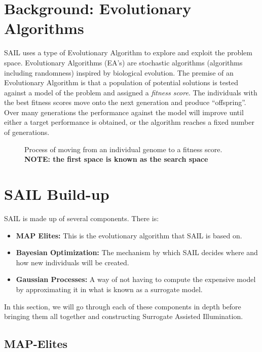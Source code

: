 \documentclass{sig-alternate}
\begin{document}
\section{Background: Evolutionary Algorithms}
\label{sec:evolutionaryAlgorithms}

SAIL uses a type of Evolutionary Algorithm to explore and exploit the problem space.
Evolutionary Algorithms (EA's) are stochastic algorithms (algorithms including randomness) inspired by biological evolution.
The premise of an Evolutionary Algorithm is that a population of potential solutions is tested against a model of the problem and assigned a \textit{fitness score}.
The individuals with the best fitness scores move onto the next generation and produce ``offspring''.
Over many generations the performance against the model will improve until either a target performance is obtained, or the algorithm reaches a fixed number of generations. 


\begin{figure*}[th]
\centering
{}
\caption{Process of moving from an individual genome to a fitness score. \textbf{NOTE: the first space is known as the search space}}
\label{fig:genome-to-fitness}
\end{figure*}

\section{SAIL Build-up}
\label{sec:SAILBuildUp}
SAIL is made up of several components. There is:
\begin{itemize}
  \item \textbf{MAP Elites:} This is the evolutionary algorithm that SAIL is based on.
  \item \textbf{Bayesian Optimization:} The mechanism by which SAIL decides where and how new individuals will be created.
  \item \textbf{Gaussian Processes:} A way of not having to compute the expensive model by approximating it in what is known as a surrogate model.
\end{itemize}
In this section, we will go through each of these components in depth before bringing them all together and constructing Surrogate Assisted Illumination.

\subsection{MAP-Elites}
\label{sec:MAP-Elites}
\end{document}
